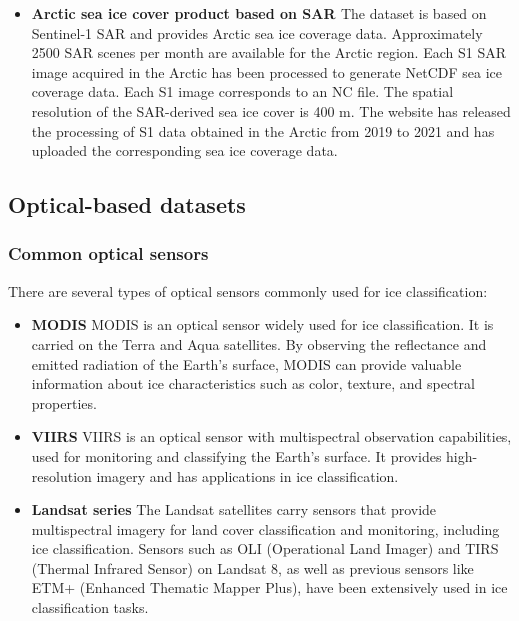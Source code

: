 \begin{itemize}
\item \textbf{Arctic sea ice cover product based on SAR \cite{95wang2021arctic}} The dataset is based on Sentinel-1 SAR and provides Arctic sea ice coverage data. Approximately 2500 SAR scenes per month are available for the Arctic region. Each S1 SAR image acquired in the Arctic has been processed to generate NetCDF sea ice coverage data. Each S1 image corresponds to an NC file. The spatial resolution of the SAR-derived sea ice cover is 400 m. The website has released the processing of S1 data obtained in the Arctic from 2019 to 2021 and has uploaded the corresponding sea ice coverage data.
\end{itemize}

\subsection {Optical-based datasets}
% 

\subsubsection {Common optical sensors}
There are several types of optical sensors commonly used for ice classification:

\begin{itemize}
\item \textbf{MODIS} MODIS is an optical sensor widely used for ice classification. It is carried on the Terra and Aqua satellites. By observing the reflectance and emitted radiation of the Earth's surface, MODIS can provide valuable information about ice characteristics such as color, texture, and spectral properties.
\end{itemize}

\begin{itemize}
\item \textbf{VIIRS} VIIRS is an optical sensor with multispectral observation capabilities, used for monitoring and classifying the Earth's surface. It provides high-resolution imagery and has applications in ice classification.
\end{itemize}

\begin{itemize}
\item \textbf{Landsat series} The Landsat satellites carry sensors that provide multispectral imagery for land cover classification and monitoring, including ice classification. Sensors such as OLI (Operational Land Imager) and TIRS (Thermal Infrared Sensor) on Landsat 8, as well as previous sensors like ETM+ (Enhanced Thematic Mapper Plus), have been extensively used in ice classification tasks.
\end{itemize}

